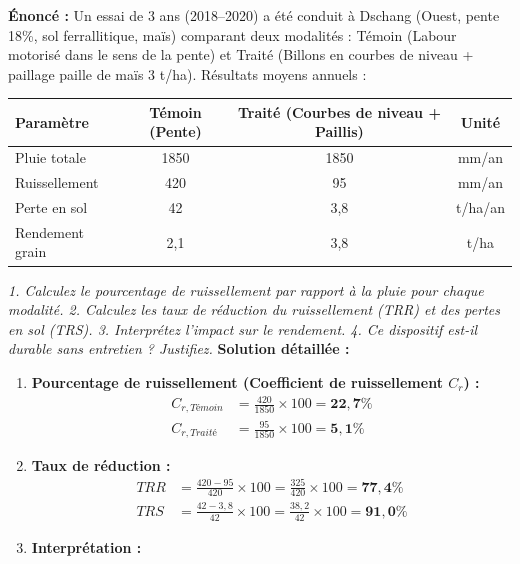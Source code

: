 \documentclass[11pt]{article}
\begin{document}
\begin{exoresolu}
    \textbf{Énoncé :} Un essai de 3 ans (2018–2020) a été conduit à Dschang (Ouest, pente 18\%, sol ferrallitique, maïs) comparant deux modalités : Témoin (Labour motorisé dans le sens de la pente) et Traité (Billons en courbes de niveau + paillage paille de maïs 3 t/ha). Résultats moyens annuels :
    \begin{center}
    \begin{tabular}{|l|c|c|c|}\hline
    \textbf{Paramètre} & \textbf{Témoin (Pente)} & \textbf{Traité (Courbes de niveau + Paillis)} & \textbf{Unité} \\ \hline
    Pluie totale & 1850 & 1850 & mm/an \\ \hline
    Ruissellement & 420 & 95 & mm/an \\ \hline
    Perte en sol & 42 & 3,8 & t/ha/an \\ \hline
    Rendement grain & 2,1 & 3,8 & t/ha \\ \hline
    \end{tabular}
    \end{center}
    \textit{1. Calculez le pourcentage de ruissellement par rapport à la pluie pour chaque modalité. 2. Calculez les taux de réduction du ruissellement (TRR) et des pertes en sol (TRS). 3. Interprétez l'impact sur le rendement. 4. Ce dispositif est-il durable sans entretien ? Justifiez.}
    \tcblower
    \textbf{Solution détaillée :}
    \begin{enumerate}
        \item \textbf{Pourcentage de ruissellement (Coefficient de ruissellement $C_r$) :}
        \begin{align*}
            C_{r,Témoin} &= \frac{420}{1850} \times 100 = \mathbf{22,7\%} \\
            C_{r,Traité} &= \frac{95}{1850} \times 100 = \mathbf{5,1\%}
        \end{align*}
        \item \textbf{Taux de réduction :}
        \begin{align*}
            TRR &= \frac{420 - 95}{420} \times 100 = \frac{325}{420} \times 100 = \mathbf{77,4\%} \\
            TRS &= \frac{42 - 3,8}{42} \times 100 = \frac{38,2}{42} \times 100 = \mathbf{91,0\%}
        \end{align*}
        \item \textbf{Interprétation :}
        \begin{itemize}

\end{itemize}
\end{enumerate}
\end{exoresolu}
\end{document}
